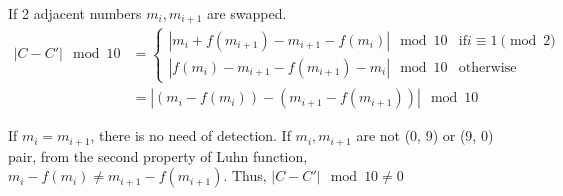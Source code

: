 If 2 adjacent numbers $m_i, m_{i+1}$ are swapped.
\begin{equation}
\begin{split}
|C - C'| \mod 10 & =
\begin{cases}
|m_i + f(m_{i + 1}) - m_{i+1} - f(m_i)| \mod 10 &\text{if} i \equiv 1 \pmod{2}
\\
|f(m_i) - m_{i+1} - f(m_{i+1}) - m_i| \mod 10 &\text{otherwise}
\end{cases}
\\
& = |(m_i - f(m_i)) - (m_{i+1} - f(m_{i+1}))| \mod 10
\end{split}
\end{equation}

If $m_i = m_{i+1}$, there is no need of detection. If $m_i, m_{i+1}$ are not (0, 9) or (9, 0) pair, from the second property of Luhn function, $m_i - f(m_i) \neq m_{i+1} - f(m_{i +1})$. Thus, $|C - C'| \mod 10 \neq 0$